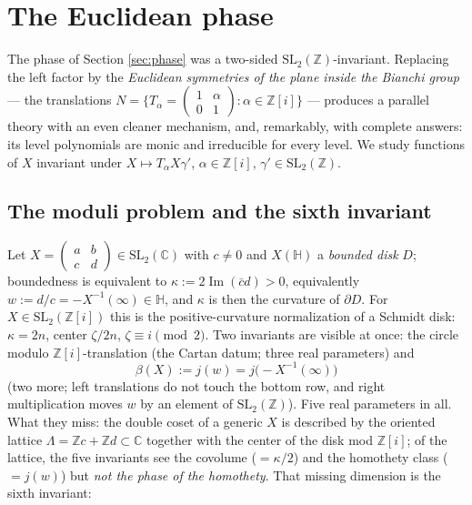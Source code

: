 \documentclass[11pt]{amsart}
\numberwithin{equation}{section}
\theoremstyle{plain}
\theoremstyle{definition}
\theoremstyle{remark}
\newcommand{\C}{\mathbb{C}}
\newcommand{\Z}{\mathbb{Z}}
\newcommand{\HH}{\mathbb{H}}
\newcommand{\Zi}{\Z[i]}
\newcommand{\SL}{\mathrm{SL}}
\newcommand{\im}{\operatorname{Im}}
\begin{document}
\section{The Euclidean phase}\label{sec:euclidean}

The phase of Section \ref{sec:phase} was a two-sided
$\SL_2(\Z)$-invariant.  Replacing the left factor by the
\emph{Euclidean symmetries of the plane inside the Bianchi group} ---
the translations $N = \{T_{\alpha} = \begin{pmatrix} 1 & \alpha \\ 0 &
1 \end{pmatrix} : \alpha \in \Zi\}$ --- produces a parallel theory
with an even cleaner mechanism, and, remarkably, with complete
answers: its level polynomials are monic and irreducible for every
level.  We study functions of $X$ invariant under $X \mapsto
T_{\alpha}X\gamma'$, $\alpha \in \Zi$, $\gamma' \in \SL_2(\Z)$.

\subsection{The moduli problem and the sixth invariant}
\label{subsec:eucmoduli}

Let $X = \begin{pmatrix} a & b \\ c & d\end{pmatrix} \in \SL_2(\C)$
with $c \ne 0$ and $X(\HH)$ a \emph{bounded disk} $D$; boundedness is
equivalent to $\kappa := 2\im(\bar cd) > 0$, equivalently
$w := d/c = -X^{-1}(\infty) \in \HH$, and $\kappa$ is then the
curvature of $\partial D$.  For $X \in \SL_2(\Zi)$ this is the
positive-curvature normalization of a Schmidt disk: $\kappa = 2n$,
center $\zeta/2n$, $\zeta \equiv i \pmod 2$.  Two invariants are
visible at once: the circle modulo $\Zi$-translation (the Cartan datum;
three real parameters) and
\[
  \beta(X) := j(w) = j\bigl(-X^{-1}(\infty)\bigr)
\]
(two more; left translations do not touch the bottom row, and right
multiplication moves $w$ by an element of $\SL_2(\Z)$).  Five real
parameters in all.  What they miss: the double coset of a generic $X$
is described by the oriented lattice $\Lambda = \Z c + \Z d \subset
\C$ together with the center of the disk mod $\Zi$; of the lattice,
the five invariants see the covolume ($= \kappa/2$) and the homothety
class ($= j(w)$) but \emph{not the phase of the homothety}.  That
missing dimension is the sixth invariant:
\end{document}
